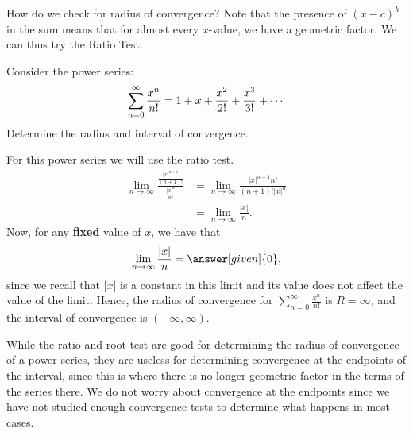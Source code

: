 \documentclass{ximera}
\begin{document}
How do we check for radius of convergence? Note that the presence of $(x-c)^k$ in the sum means that for almost every $x$-value, we have a geometric factor.  We can thus try the Ratio Test.

\begin{example}
  Consider the power series:
  \[
  \sum_{n=0}^\infty \frac{x^n}{n!} = 1 + x + \frac{x^2}{2!} + \frac{x^3}{3!} + \cdots\\
  \]
  Determine the radius and interval of convergence.
  \begin{explanation}
    For this power series we will use the ratio test. 
    \begin{align*}
      \lim_{n\to\infty} \frac{\frac{|x|^{n+1}}{(n+1)!}}{\frac{|x|^n}{n!}}
      &= \lim_{n\to\infty} \frac{|x|^{n+1}n!}{(n+1)!|x|^n}\\
      &= \lim_{n\to\infty} \frac{|x|}{n}.
    \end{align*}
    Now, for any \textbf{fixed} value of $x$, we have that
    \[
    \lim_{n\to\infty} \frac{|x|}{n} = \answer[given]{0},
    \]
    since we recall that $|x|$ is a constant in this limit and its value 
    does not affect the value of the limit.  Hence, the radius of convergence for $\sum_{n=0}^\infty
    \frac{x^n}{n!}$ is $R=\infty$, and the interval of convergence is $(-\infty, \infty)$.
  \end{explanation}
\end{example}

\begin{remark}
While the ratio and root test are good for determining the radius of
convergence of a power series, they are useless for determining
convergence at the endpoints of the interval, since this is where 
there is no longer geometric factor in the terms of the series there.
We do not worry about convergence at the endpoints since we have not studied
enough convergence tests to determine what happens in most cases.
\end{remark}
\end{document}
